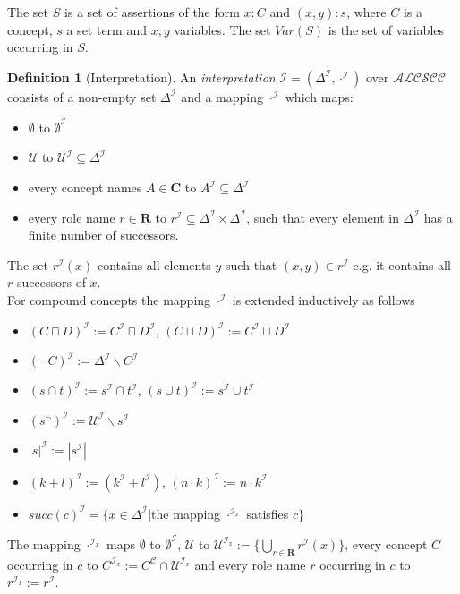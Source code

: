 \documentclass[a4paper,11pt]{scrartcl}
\theoremstyle{break}
\theoremstyle{definition}
\newtheorem{mydef}{Definition}
\begin{document}
The set $S$ is a set of assertions of the form $x:C$ and $(x,y):s$, where $C$ is a concept, $s$ a set term and $x,y$ variables. The set $Var(S)$ is the set of variables occurring in $S$.
\begin{mydef}[Interpretation]
An \textit{interpretation} $\mathcal{I=(\Delta^\mathcal{I},\cdot^\mathcal{I})}$ over $\mathcal{ALCSCC}$ consists of a non-empty set $\Delta^\mathcal{I}$ and a mapping $\cdot^\mathcal{I}$ which maps:
\begin{itemize}
\item $\emptyset$ to $\emptyset^\mathcal{I}$
\item $\mathcal{U}$ to $\mathcal{U}^\mathcal{I}\subseteq \Delta^\mathcal{I}$
\item every concept names $A\in\mathbf{C}$ to $A^\mathcal{I}\subseteq \Delta^\mathcal{I}$
\item every role name $r\in\mathbf{R}$ to $r^\mathcal{I}\subseteq\Delta^\mathcal{I}\times\Delta^\mathcal{I}$, such that every element in $\Delta^\mathcal{I}$ has a finite number of successors.
\end{itemize}
The set $r^\mathcal{I}(x)$ contains all elements $y$ such that $(x,y)\in r^\mathcal{I}$ e.g. it contains all $r$-successors of $x$.\\
For compound concepts the mapping $\cdot^\mathcal{I}$ is extended inductively as follows
\begin{itemize}
\item $(C\sqcap D)^\mathcal{I}:=C^\mathcal{I}\sqcap D^\mathcal{I}$, $(C\sqcup D)^\mathcal{I}:=C^\mathcal{I}\sqcup D^\mathcal{I}$
\item $(\neg C)^\mathcal{I}:=\Delta^\mathcal{I}\backslash C^\mathcal{I}$
\item $(s\cap t)^\mathcal{I}:= s^\mathcal{I}\cap t^\mathcal{I}$, $(s\cup t)^\mathcal{I}:= s^\mathcal{I}\cup t^\mathcal{I}$
\item $(s^\neg)^\mathcal{I}:=\mathcal{U}^\mathcal{I}\backslash s^\mathcal{I}$
\item $|s|^\mathcal{I}:=|s^\mathcal{I}|$
\item $(k+l)^\mathcal{I}:=(k^\mathcal{I}+l^\mathcal{I})$, $(n\cdot k)^\mathcal{I}:= n\cdot k^\mathcal{I}$
\item $succ(c)^\mathcal{I}=\{x\in \Delta^\mathcal{I}|$the mapping $\cdot^{\mathcal{I}_x}$ satisfies $c\}$
\end{itemize}
The mapping $\cdot^{\mathcal{I}_x}$ maps $\emptyset$ to $\emptyset^\mathcal{I}$, $\mathcal{U}$ to $\mathcal{U}^{\mathcal{I}_x}:=\{\bigcup_{r\in\mathbf{R}}r^\mathcal{I}(x)\}$, every concept $C$ occurring in $c$ to $C^{\mathcal{I}_x}:=C^\mathcal{C}\cap \mathcal{U}^{\mathcal{I}_x}$ and every role name $r$ occurring in $c$ to $r^{\mathcal{I}_x}:=r^\mathcal{I}$.\\

\end{mydef}
\end{document}
